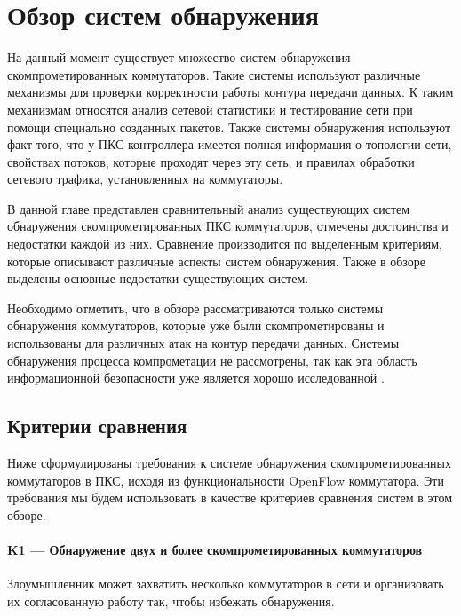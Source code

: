 \documentclass[../thesis.tex]{subfiles}
\begin{document}
\chapter{Обзор систем обнаружения} \label{chapter:survey}

На данный момент существует множество систем обнаружения скомпрометированных коммутаторов.
Такие системы используют различные механизмы для проверки корректности работы контура передачи данных.
К таким механизмам относятся анализ сетевой статистики и тестирование сети при помощи специально созданных пакетов.
Также системы обнаружения используют факт того, что у ПКС контроллера имеется полная информация о топологии сети, свойствах потоков, которые проходят через эту сеть, и правилах обработки сетевого трафика, установленных на коммутаторы.

В данной главе представлен сравнительный анализ существующих систем обнаружения скомпрометированных ПКС коммутаторов, отмечены достоинства и недостатки каждой из них.
Сравнение производится по выделенным критериям, которые описывают различные аспекты систем обнаружения.
Также в обзоре выделены основные недостатки существующих систем.

Необходимо отметить, что в обзоре рассматриваются только системы обнаружения коммутаторов, которые уже были скомпрометированы и использованы для различных атак на контур передачи данных.
Системы обнаружения процесса компрометации не рассмотрены, так как эта область информационной безопасности уже является хорошо исследованной \cite{axelsson2000intrusion}.

\newpage
\section{Критерии сравнения}

Ниже сформулированы требования к системе обнаружения скомпрометированных коммутаторов в ПКС, исходя из функциональности OpenFlow коммутатора.
Эти требования мы будем использовать в качестве критериев сравнения систем в этом обзоре.

\subsubsection{K1 --- Обнаружение двух и более скомпрометированных коммутаторов} \label{criterion:K1}

Злоумышленник может захватить несколько коммутаторов в сети и организовать их согласованную работу так, чтобы избежать обнаружения.
\end{document}
